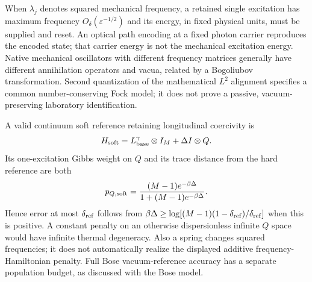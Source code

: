 \documentclass[aps,pra,reprint,superscriptaddress,longbibliography]{revtex4-2}
\begin{document}
When $\lambda_j$ denotes squared mechanical frequency, a retained
single excitation has maximum frequency
$O_\delta(\varepsilon^{-1/2})$ and its energy, in fixed physical
units, must be supplied and reset. An optical path encoding at a
fixed photon carrier reproduces the encoded state; that carrier
energy is not the mechanical excitation energy. Native mechanical
oscillators with different frequency matrices generally have
different annihilation operators and vacua, related by a Bogoliubov
transformation. Second quantization of the mathematical $L^2$
alignment specifies a common number-conserving Fock model; it does
not prove a passive, vacuum-preserving laboratory identification.

A valid continuum soft reference retaining longitudinal coercivity is
\[
 H_{\rm soft}=L_{\rm base}^{\gamma}\otimes I_M+\Delta I\otimes Q.
\]
Its one-excitation Gibbs weight on $Q$ and its trace distance from the
hard reference are both
\begin{equation}
 p_{Q,\rm soft}=
 \frac{(M-1)e^{-\beta\Delta}}
 {1+(M-1)e^{-\beta\Delta}}.
 \label{sgt:prep:soft-reference}
\end{equation}
Hence error at most $\delta_{\rm ref}$ follows from
$\beta\Delta\ge
\log[(M-1)(1-\delta_{\rm ref})/\delta_{\rm ref}]$ when this is positive.
A constant penalty on an otherwise dispersionless infinite $Q$ space
would have infinite thermal degeneracy. Also a spring changes squared
frequencies; it does not automatically realize the displayed additive
frequency-Hamiltonian penalty. Full Bose vacuum-reference accuracy
has a separate population budget, as discussed with the Bose model.
\end{document}
